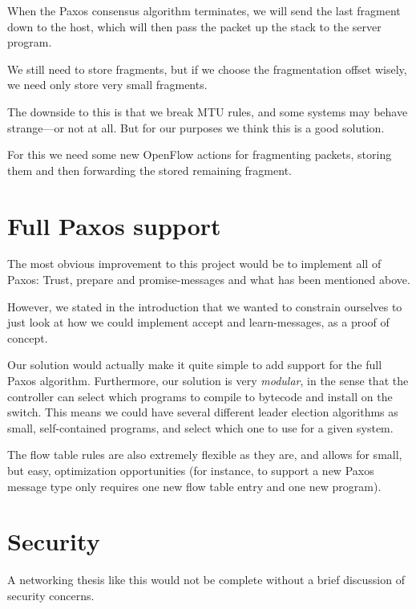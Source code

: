 When the Paxos consensus algorithm terminates, we will send the last
fragment down to the host, which will then pass the packet up the stack to
the server program.

We still need to store fragments, but if we choose the fragmentation offset
wisely, we need only store very small fragments.

The downside to this is that we break MTU rules, and some systems may behave
strange---or not at all.  But for our purposes we think this is a good
solution.

For this we need some new OpenFlow actions for fragmenting packets, storing
them and then forwarding the stored remaining fragment.

\section{Full Paxos support}

The most obvious improvement to this project would be to implement all of
Paxos: Trust, prepare and
promise-messages and what has been mentioned above.

However, we stated in the introduction that we wanted to constrain ourselves
to just look at how we could implement accept and learn-messages, as a
proof of concept.

Our solution would actually make it quite simple to add support for the full
Paxos algorithm.  Furthermore, our solution is very \textit{modular}, in the
sense that the controller can select which programs to compile to bytecode
and install on the switch.  This means we could have several different
leader election algorithms as small, self-contained programs, and select
which one to use for a given system.

The flow table rules are also extremely flexible as they are, and allows for
small, but easy, optimization opportunities (for instance, to support a new
Paxos message type only requires one new flow table entry and one new
program).


\section{Security}

A networking thesis like this would not be complete without a brief
discussion of security concerns.

